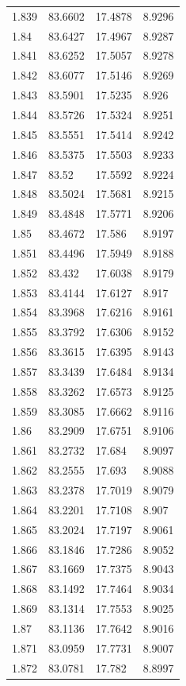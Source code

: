 \begin{tabular}{llll}
1.839 & 83.6602 & 17.4878 & 8.9296 \\
1.84 & 83.6427 & 17.4967 & 8.9287 \\
1.841 & 83.6252 & 17.5057 & 8.9278 \\
1.842 & 83.6077 & 17.5146 & 8.9269 \\
1.843 & 83.5901 & 17.5235 & 8.926 \\
1.844 & 83.5726 & 17.5324 & 8.9251 \\
1.845 & 83.5551 & 17.5414 & 8.9242 \\
1.846 & 83.5375 & 17.5503 & 8.9233 \\
1.847 & 83.52 & 17.5592 & 8.9224 \\
1.848 & 83.5024 & 17.5681 & 8.9215 \\
1.849 & 83.4848 & 17.5771 & 8.9206 \\
1.85 & 83.4672 & 17.586 & 8.9197 \\
1.851 & 83.4496 & 17.5949 & 8.9188 \\
1.852 & 83.432 & 17.6038 & 8.9179 \\
1.853 & 83.4144 & 17.6127 & 8.917 \\
1.854 & 83.3968 & 17.6216 & 8.9161 \\
1.855 & 83.3792 & 17.6306 & 8.9152 \\
1.856 & 83.3615 & 17.6395 & 8.9143 \\
1.857 & 83.3439 & 17.6484 & 8.9134 \\
1.858 & 83.3262 & 17.6573 & 8.9125 \\
1.859 & 83.3085 & 17.6662 & 8.9116 \\
1.86 & 83.2909 & 17.6751 & 8.9106 \\
1.861 & 83.2732 & 17.684 & 8.9097 \\
1.862 & 83.2555 & 17.693 & 8.9088 \\
1.863 & 83.2378 & 17.7019 & 8.9079 \\
1.864 & 83.2201 & 17.7108 & 8.907 \\
1.865 & 83.2024 & 17.7197 & 8.9061 \\
1.866 & 83.1846 & 17.7286 & 8.9052 \\
1.867 & 83.1669 & 17.7375 & 8.9043 \\
1.868 & 83.1492 & 17.7464 & 8.9034 \\
1.869 & 83.1314 & 17.7553 & 8.9025 \\
1.87 & 83.1136 & 17.7642 & 8.9016 \\
1.871 & 83.0959 & 17.7731 & 8.9007 \\
1.872 & 83.0781 & 17.782 & 8.8997 \\

\end{tabular}
